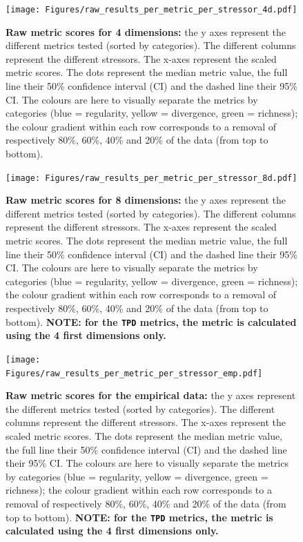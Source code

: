\documentclass[12pt,letterpaper]{article}
\begin{document}
\begin{figure}[!htbp]
\centering
   \texttt{[image: Figures/raw\_results\_per\_metric\_per\_stressor\_4d.pdf]}
\caption{\scriptsize{\textbf{Raw metric scores for 4 dimensions:} the y axes represent the different metrics tested (sorted by categories).
The different columns represent the different stressors.
The x-axes represent the scaled metric scores.
The dots represent the median metric value, the full line their 50\% confidence interval (CI) and the dashed line their 95\% CI.
The colours are here to visually separate the metrics by categories (blue = regularity, yellow = divergence, green = richness); the colour gradient within each row corresponds to a removal of respectively 80\%, 60\%, 40\% and 20\% of the data (from top to bottom).
}}
\label{Fig:raw_results_4d}
\end{figure}
\bigskip


\begin{figure}[!htbp]
\centering
   \texttt{[image: Figures/raw\_results\_per\_metric\_per\_stressor\_8d.pdf]}
\caption{\scriptsize{\textbf{Raw metric scores for 8 dimensions:} the y axes represent the different metrics tested (sorted by categories).
The different columns represent the different stressors.
The x-axes represent the scaled metric scores.
The dots represent the median metric value, the full line their 50\% confidence interval (CI) and the dashed line their 95\% CI.
The colours are here to visually separate the metrics by categories (blue = regularity, yellow = divergence, green = richness); the colour gradient within each row corresponds to a removal of respectively 80\%, 60\%, 40\% and 20\% of the data (from top to bottom).
}
\textbf{NOTE: for the \texttt{TPD} metrics, the metric is calculated using the 4 first dimensions only.}
}
\label{Fig:raw_results_8d}
\end{figure}
\bigskip


\begin{figure}[!htbp]
\centering
   \texttt{[image: Figures/raw\_results\_per\_metric\_per\_stressor\_emp.pdf]}
\caption{\scriptsize{\textbf{Raw metric scores for the empirical data:} the y axes represent the different metrics tested (sorted by categories).
The different columns represent the different stressors.
The x-axes represent the scaled metric scores.
The dots represent the median metric value, the full line their 50\% confidence interval (CI) and the dashed line their 95\% CI.
The colours are here to visually separate the metrics by categories (blue = regularity, yellow = divergence, green = richness); the colour gradient within each row corresponds to a removal of respectively 80\%, 60\%, 40\% and 20\% of the data (from top to bottom).
\textbf{NOTE: for the \texttt{TPD} metrics, the metric is calculated using the 4 first dimensions only.}
}}
\label{Fig:raw_results_emp}
\end{figure}
\bigskip
\end{document}
